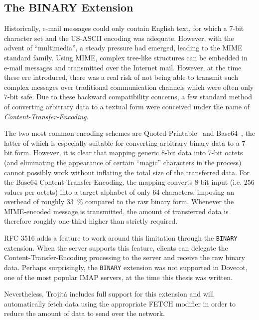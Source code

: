 \documentclass[trojita]{subfiles}
\begin{document}
\subsection{The BINARY Extension}

Historically, e-mail messages could only contain English text, for which a 7-bit character set and the US-ASCII encoding
was adequate.  However, with the advent of ``multimedia'', a steady pressure had emerged, leading to the MIME standard
family.  Using MIME, complex tree-like structures can be embedded in e-mail messages and transmitted over the Internet
mail.  However, at the time these ere introduced, there was a real risk of not being able to transmit such complex
messages over traditional communication channels which were often only 7-bit safe.  Due to these backward compatibility
concerns, a few standard method of converting arbitrary data to a textual form were conceived under the name of {\em
Content-Transfer-Encoding}.

The two most common encoding schemes are Quoted-Printable~\cite[p. 18]{rfc2045} and Base64~\cite[p. 23]{rfc2045}, the
latter of which is especially suitable for converting arbitrary binary data to a 7-bit form.  However, it is clear that
mapping generic 8-bit data into 7-bit octets (and eliminating the appearance of certain ``magic'' characters in the
process) cannot possibly work without inflating the total size of the transferred data.  For the Base64
Content-Transfer-Encoding, the mapping converts 8-bit input (i.e. 256 values per octets) into a target alphabet of only
64 characters, imposing an overhead of roughly 33~\% compared to the raw binary form.  Whenever the MIME-encoded message
is transmitted, the amount of transferred data is therefore roughly one-third higher than strictly required.

RFC 3516 \cite{rfc3516} adds a feature to work around this limitation through the {\tt BINARY} extension.  When the
server supports this feature, clients can delegate the Content-Transfer-Encoding processing to the server and receive
the raw binary data.  Perhaps surprisingly, the {\tt BINARY} extension was not supported in Dovecot, one of the most
popular IMAP servers, at the time this thesis was written.

\begin{trojitabehavior}
Nevertheless, Trojitá includes full support for this extension and will automatically fetch data using the appropriate
FETCH modifier in order to reduce the amount of data to send over the network.
\end{trojitabehavior}
\end{document}
